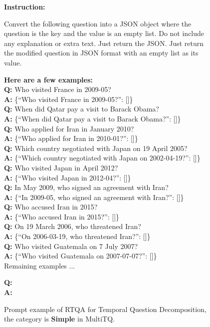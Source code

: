 \documentclass[11pt]{article}
\begin{document}
\begin{figure}[h]
\begin{tcolorbox}[
    colback=black!10, 
    colframe=black!70, 
    boxrule=1pt, 
    arc=5mm, 
    boxsep=2mm, 
    left=5mm, 
    right=5mm, 
    top=5mm, 
    bottom=4mm,
    width=\textwidth, %
    nobeforeafter, %
    colupper=black %
]
{\small\sffamily %
\textbf{Instruction:} 

Convert the following question into a JSON object where the question is the key and the value is an empty list. Do not include any explanation or extra text. Just return the JSON.
Just return the modified question in JSON format with an empty list as its value.

\vspace{0.5em}
\textbf{Here are a few examples:}\\[0.5em]
\textbf{Q:} Who visited France in 2009-05? \\
\textbf{A:} \{``Who visited France in 2009-05?'': []\} \\[0.5em]
\textbf{Q:} When did Qatar pay a visit to Barack Obama? \\
\textbf{A:} \{``When did Qatar pay a visit to Barack Obama?'': []\} \\[0.5em]
\textbf{Q:} Who applied for Iran in January 2010? \\
\textbf{A:} \{``Who applied for Iran in 2010-01?'': []\} \\[0.5em]
\textbf{Q:} Which country negotiated with Japan on 19 April 2005? \\
\textbf{A:} \{``Which country negotiated with Japan on 2002-04-19?'': []\} \\[0.5em]
\textbf{Q:} Who visited Japan in April 2012? \\
\textbf{A:} \{``Who visited Japan in 2012-04?'': []\} \\[0.5em]
\textbf{Q:} In May 2009, who signed an agreement with Iran? \\
\textbf{A:} \{``In 2009-05, who signed an agreement with Iran?'': []\} \\[0.5em]
\textbf{Q:} Who accused Iran in 2015? \\
\textbf{A:} \{``Who accused Iran in 2015?'': []\} \\[0.5em]
\textbf{Q:} On 19 March 2006, who threatened Iran? \\
\textbf{A:} \{``On 2006-03-19, who threatened Iran?'': []\} \\[0.5em]
\textbf{Q:} Who visited Guatemala on 7 July 2007? \\
\textbf{A:} \{``Who visited Guatemala on 2007-07-07?'': []\} \\[0.5em]
Remaining examples ...
\vspace{0.5em}

\textbf{Q:}  \\
\textbf{A:} 
} %
\end{tcolorbox}
\caption{Prompt example of RTQA for Temporal Question Decomposition, the category is \textbf{Simple} in MultiTQ.}
\label{fig:prompt equal}
\end{figure}
\end{document}

